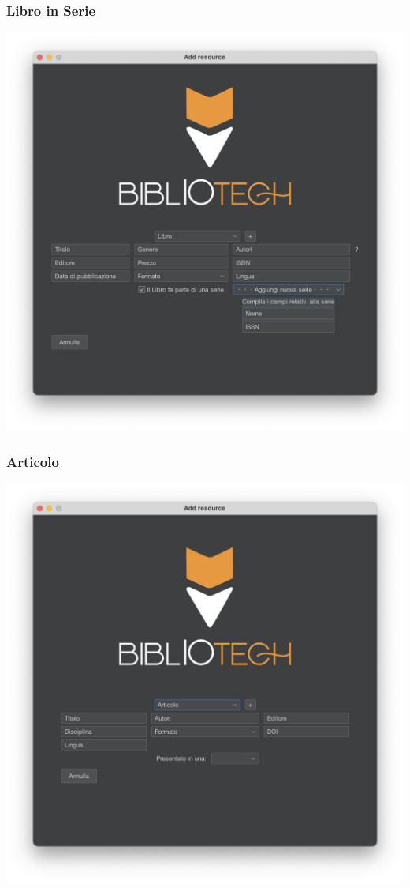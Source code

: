  \subsubsection{Libro in Serie}
 \includegraphics[scale=0.25, center]{Immagini/Schermate/Insert/InserisciRisorsaPage-LibroSerie.png}

 \subsubsection{Articolo}
 \includegraphics[scale=0.25, center]{Immagini/Schermate/Insert/InserisciRisorsaPage-Articolo.png}
